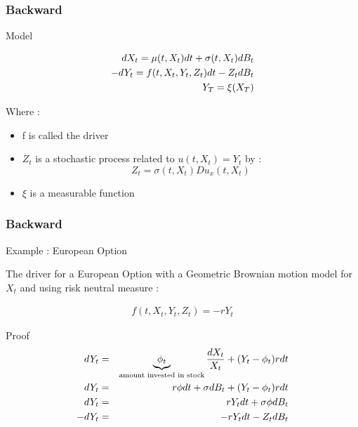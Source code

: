 \documentclass[10pt]{beamer}
\begin{document}
 \begin{frame} 
 	
 	
 	\frametitle{Backward}
 		
 		
 		
 		\begin{block}{Model}
 
 				\begin{eqnarray}
 				dX_t = \mu(t,X_t)dt + \sigma (t, X_t) dB_t\notag\\
 				-dY_t = f(t,X_t, Y_t, Z_t)dt - Z_tdB_t \notag\\
 				Y_T=\xi (X_T) \notag
 				\end{eqnarray}
 				
 				\pause
 				
 				Where :
 				
 				\begin{itemize}
 					\item f is called the driver 
 					\item $Z_t$ is a stochastic process related to $u(t,X_t) = Y_t$ by : 
 					\[Z_t = \sigma(t, X_t) Du_x (t, X_t)\]
 					\item $\xi$ is a measurable function
 				\end{itemize}
 	
 		\end{block}
 		
 \end{frame}
 
\begin{frame} 


	\frametitle{Backward}
	
	
	
	\begin{block}{Example : European Option}
	
			The driver for a European Option with a Geometric Brownian motion model for $X_t$ and using risk neutral measure : 
			
			\begin{eqnarray}
			f(t,X_t, Y_t, Z_t) = - r Y_t
			\end{eqnarray}
		
	\end{block}
	
\end{frame}

\begin{frame}
	
	
	\begin{block}{Proof}
		\begin{eqnarray}
		dY_t & =& \underbrace{\phi_t}_{\text{amount invested in stock}} \frac{dX_t}{X_t} + (Y_t - \phi_t)rdt \notag\\
		dY_t &=&r\phi dt + \sigma dB_t + (Y_t - \phi_t)rdt \notag\\
		dY_t &=& rY_tdt + \sigma \phi dB_t\notag \\
		- dY_t &=& - rY_tdt - Z_t dB_t 
		\end{eqnarray}
		\end{block}

\end{frame}
\end{document}
